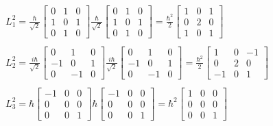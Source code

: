 \begin{equation}
  \begin{array}{c}
  L_1^2 = \frac{\hbar}{\sqrt{2}}
  \left[\begin{matrix}
    0 & 1 & 0\\
      1 & 0 & 1\\
      0 & 1 & 0
  \end{matrix}
  \right]\frac{\hbar}{\sqrt{2}}
  \left[\begin{matrix}
    0 & 1 & 0\\
      1 & 0 & 1\\
      0 & 1 & 0
  \end{matrix}
  \right] = \frac{\hbar^2}{2}
  \left[\begin{matrix}
    1 & 0 & 1\\
      0 & 2 & 0\\
      1 & 0 & 1
  \end{matrix}
  \right]
  \\

  \\
  L_2^2 = \frac{i\hbar}{\sqrt{2}}
  \left[\begin{matrix}
    0 & 1 & 0\\
    -1 & 0 & 1\\
    0 & -1 & 0
  \end{matrix}\right]
  \frac{i\hbar}{\sqrt{2}}
    \left[\begin{matrix}
      0 & 1 & 0\\
      -1 & 0 & 1\\
      0 & -1 & 0
    \end{matrix}\right] =
    \frac{\hbar^2}{2}
    \left[\begin{matrix}
      1 & 0 & -1\\
      0 & 2 & 0\\
      -1 & 0 & 1
    \end{matrix}\right]
    \\

    \\
    L_3^2 = \hbar
    \left[\begin{matrix}
      -1 & 0 & 0\\
      0 & 0 & 0\\
      0 & 0 & 1
    \end{matrix}\right]
    \hbar
    \left[\begin{matrix}
      -1 & 0 & 0\\
      0 & 0 & 0\\
      0 & 0 & 1
    \end{matrix}\right] =
    \hbar^2
    \left[\begin{matrix}
      1 & 0 & 0\\
      0 & 0 & 0\\
      0 & 0 & 1
    \end{matrix}\right]
    \\


\end{array}
\end{equation}
